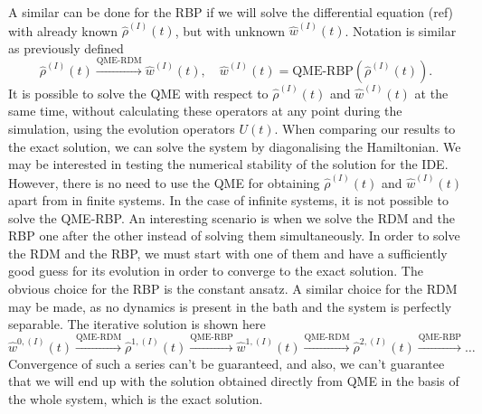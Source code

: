 A similar can be done for the RBP if we will solve the differential equation (ref) with already known $\hat{\rho}^{(I)}(t)$, but with unknown $\hat{w}^{(I)}(t)$. Notation is similar as previously defined
\begin{equation}
\label{IQME_iterations}
    \hat{\rho}^{(I)}(t) \overset{\text{QME-RDM}}{\longrightarrow} \hat{w}^{(I)}(t), \quad \hat{w}^{(I)}(t) = \text{QME-RBP} (\hat{\rho}^{(I)}(t)).
\end{equation}
It is possible to solve the QME with respect to $\hat{\rho}^{(I)}(t)$ and $\hat{w}^{(I)}(t)$ at the same time, without calculating these operators at any point during the simulation, using the evolution operators $U(t)$. When comparing our results to the exact solution, we can solve the system by diagonalising the Hamiltonian. We may be interested in testing the numerical stability of the solution for the IDE. However, there is no need to use the QME for obtaining $\hat{\rho}^{(I)}(t)$ and $\hat{w}^{(I)}(t)$ apart from in finite systems. In the case of infinite systems, it is not possible to solve the QME-RBP. An interesting scenario is when we solve the RDM and the RBP one after the other instead of solving them simultaneously. In order to solve the RDM and the RBP, we must start with one of them and have a sufficiently good guess for its evolution in order to converge to the exact solution. The obvious choice for the RBP is the constant ansatz. A similar choice for the RDM may be made, as no dynamics is present in the bath and the system is perfectly separable. The iterative solution is shown here
\begin{equation}
\label{RDM_RBP_iteration}
    \hat{w}^{0,(I)}(t) \overset{\text{QME-RDM}}{\longrightarrow} \hat{\rho}^{1,(I)}(t) \overset{\text{QME-RBP}}{\longrightarrow} \hat{w}^{1,(I)}(t) \overset{\text{QME-RDM}}{\longrightarrow} \hat{\rho}^{2,(I)}(t)
    \overset{\text{QME-RBP}}{\longrightarrow} \ldots
\end{equation}
Convergence of such a series can't be guaranteed, and also, we can't guarantee that we will end up with the solution obtained directly from QME in the basis of the whole system, which is the exact solution. 

